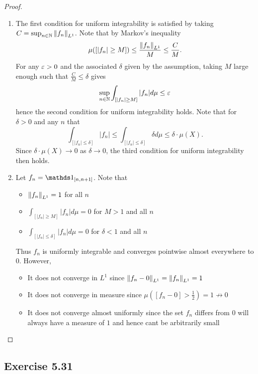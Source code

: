 \documentclass[hw_all.tex]{subfiles}
\begin{document}
\begin{proof}
\begin{enumerate}
        \item 
            The first condition for uniform integrability is satisfied by taking $C = \sup_{n \in \mathbb{N}} \norm{f_n}_{L^1}$. Note that by Markov's inequality
            \[
                \mu([|f_n| \geq M]) \leq \frac{\norm{f_n}_{L^1}}{M} \leq \frac{C}{M}
            .\]
            For any $\varepsilon > 0$ and the associated $\delta$ given by the assumption, taking $M$ large enough such that $\frac{C}{M} \leq \delta$ gives
            \[
                \sup_{n \in \mathbb{N}} \int_{[|f_n| \geq M]} |f_n| d \mu \leq \varepsilon
            \]
            hence the second condition for uniform integrability holds. Note that for $\delta > 0$ and any $n$ that
            \[
                \int_{[|f_n| \leq \delta]} |f_n| \leq \int_{[|f_n| \leq \delta]} \delta d \mu \leq \delta \cdot \mu(X)
            .\]
            Since $\delta \cdot \mu(X) \to 0$ as $\delta \to 0$, the third condition for uniform integrability then holds.

        \item 
            Let $f_n = \ind{[n, n+1]}$. Note that
            \begin{itemize}
                \item $\norm{f_n}_{L^1} = 1$ for all $n$
                \item $\int_{[|f_n| \geq M]} |f_n| d \mu = 0$ for $M > 1$ and all $n$
                \item $\int_{[|f_n| \leq \delta]} |f_n| d \mu = 0$ for $\delta < 1$ and all $n$
            \end{itemize}
            Thus $f_n$ is uniformly integrable and converges pointwise almost everywhere to $0$. However,
            \begin{itemize}
                \item It does not converge in $L^1$ since $\norm{f_n - 0}_{L^1} = \norm{f_n}_{L^1} = 1$
                \item It does not converge in measure since $\mu([f_n - 0] > \frac{1}{2}) = 1 \not\to 0$
                \item It does not converge almost uniformly since the set $f_n$ differs from $0$ will always have a measure of $1$ and hence cant be arbitrarily small
            \end{itemize}
    \end{enumerate}
\end{proof}

\subsection{Exercise 5.31}
\end{document}
